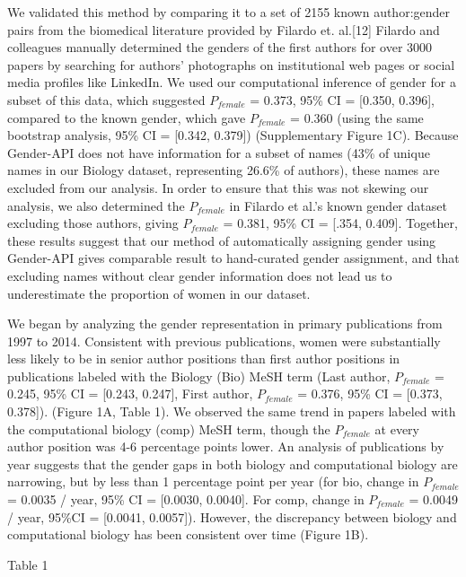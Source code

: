 \documentclass[11pt]{article}
\begin{document}
We validated this method by comparing it to a set of 2155 known author:gender pairs from the biomedical literature provided by Filardo et. al.[12] Filardo and colleagues manually determined the genders of the first authors for over 3000 papers by searching for authors’ photographs on institutional web pages or social media profiles like LinkedIn. We used our computational inference of gender for a subset of this data, which suggested $P_{female}$ = 0.373, 95\% CI = [0.350, 0.396], compared to the known gender, which gave $P_{female}$ = 0.360 (using the same bootstrap analysis, 95\% CI = [0.342, 0.379]) (Supplementary Figure 1C). Because Gender-API does not have information for a subset of names (43\% of unique names in our Biology dataset, representing 26.6\% of authors), these names are excluded from our analysis. In order to ensure that this was not skewing our analysis, we also determined the $P_{female}$ in Filardo et al.'s known gender dataset excluding those authors, giving $P_{female}$ = 0.381, 95\% CI = [.354, 0.409]. Together, these results suggest that our method of automatically assigning gender using Gender-API gives comparable result to hand-curated gender assignment, and that excluding names without clear gender information does not lead us to underestimate the proportion of women in our dataset.

We began by analyzing the gender representation in primary publications from 1997 to 2014. Consistent with previous publications, women were substantially less likely to be in senior author positions than first author positions in publications labeled with the Biology (Bio) MeSH term (Last author, $P_{female}$ = 0.245, 95\% CI = [0.243, 0.247], First author, $P_{female}$ = 0.376, 95\% CI = [0.373, 0.378]). (Figure 1A, Table 1). We observed the same trend in papers labeled with the computational biology (comp) MeSH term, though the $P_{female}$ at every author position was 4-6  percentage points lower. An analysis of publications by year suggests that the gender gaps in both biology and computational biology are narrowing, but by less than 1 percentage point  per year (for bio, change in $P_{female}$ = 0.0035 / year, 95\% CI = [0.0030, 0.0040]. For comp, change in $P_{female}$ = 0.0049 / year, 95\%CI = [0.0041, 0.0057]). However, the discrepancy between biology and computational biology has been consistent over time (Figure 1B).

Table 1
\end{document}
